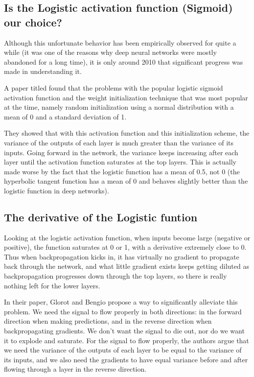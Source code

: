 \documentclass[letterpaper,10pt,english]{sphinxmanual}
\begin{document}
\subsection{Is the Logistic activation function (Sigmoid)  our choice?}
\label{\detokenize{chapter6:is-the-logistic-activation-function-sigmoid-our-choice}}
Although this unfortunate behavior has been empirically observed for
quite a while (it was one of the reasons why deep neural networks were
mostly abandoned for a long time), it is only around 2010 that
significant progress was made in understanding it.

A paper titled  found that
the problems with the popular logistic
sigmoid activation function and the weight initialization technique
that was most popular at the time, namely random initialization using
a normal distribution with a mean of 0 and a standard deviation of
1.

They showed that with this activation function and this
initialization scheme, the variance of the outputs of each layer is
much greater than the variance of its inputs. Going forward in the
network, the variance keeps increasing after each layer until the
activation function saturates at the top layers. This is actually made
worse by the fact that the logistic function has a mean of 0.5, not 0
(the hyperbolic tangent function has a mean of 0 and behaves slightly
better than the logistic function in deep networks).


\subsection{The derivative of the Logistic funtion}
\label{\detokenize{chapter6:the-derivative-of-the-logistic-funtion}}
Looking at the logistic activation function, when inputs become large
(negative or positive), the function saturates at 0 or 1, with a
derivative extremely close to 0. Thus when backpropagation kicks in,
it has virtually no gradient to propagate back through the network,
and what little gradient exists keeps getting diluted as
backpropagation progresses down through the top layers, so there is
really nothing left for the lower layers.

In their paper, Glorot and Bengio propose a way to significantly
alleviate this problem. We need the signal to flow properly in both
directions: in the forward direction when making predictions, and in
the reverse direction when backpropagating gradients. We don’t want
the signal to die out, nor do we want it to explode and saturate. For
the signal to flow properly, the authors argue that we need the
variance of the outputs of each layer to be equal to the variance of
its inputs, and we also need the gradients to have equal variance
before and after flowing through a layer in the reverse direction.
\end{document}
